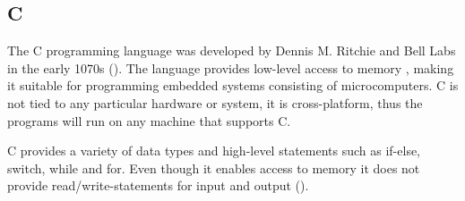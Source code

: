 \subsection{C}
The C programming language was developed by Dennis M. Ritchie and Bell Labs in the early 1070s (\cite{clanguage}). The language provides low-level access to memory , making it suitable for programming embedded systems consisting of microcomputers. C is not tied to any particular hardware or system, it is cross-platform, thus the programs will run on any machine that supports C.

C provides a variety of data types and high-level statements such as if-else, switch, while and for. Even though it enables access to memory it does not provide read/write-statements for input and output (\cite{cproglang}). 